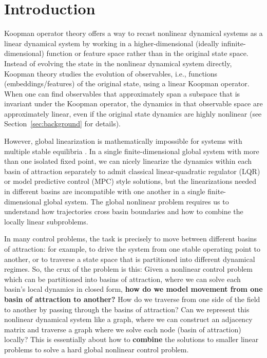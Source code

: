 \section{Introduction}

Koopman operator theory \citep{koopman_hamiltonian_1931, koopman_dynamical_1932, lan_linearization_2013,brunton_koopman_2016, brunton_modern_2022} offers a way to recast nonlinear dynamical systems as a linear dynamical system by working in a higher-dimensional (ideally infinite-dimensional) function or feature space rather than in the original state space.
Instead of evolving the state in the nonlinear dynamical system directly, Koopman theory studies the evolution of observables, i.e., functions (embeddings/features) of the original state, using a linear Koopman operator.
When one can find observables that approximately span a subspace that is invariant under the Koopman operator, the dynamics in that observable space are approximately linear, even if the original state dynamics are highly nonlinear (see Section~\ref{sec:background} for details).

However, global linearization is mathematically impossible for systems with multiple stable equilibria \citep{lan_linearization_2013, brunton_koopman_2016}.
In a single finite-dimensional global system with more than one isolated fixed point, we can nicely linearize the dynamics within each basin of attraction separately to admit classical linear-quadratic regulator (LQR) \citep{kalman_general_1960} or model predictive control (MPC) \citep{korda_linear_2018} style solutions, but the linearizations needed in different basins are incompatible with one another in a single finite-dimensional global system. The global nonlinear problem requires us to understand how trajectories cross basin boundaries and how to combine the locally linear subproblems.

In many control problems, the task is precisely to move between different basins of attraction: for example, to drive the system from one stable operating point to another, or to traverse a state space that is partitioned into different dynamical regimes. 
So, the crux of the problem is this: Given a nonlinear control problem which can be partitioned into basins of attraction, where we can solve each basin's local dynamics in closed form, \textbf{how do we model movement from one basin of attraction to another?}
How do we traverse from one side of the field to another by passing through the basins of attraction?
Can we represent this nonlinear dynamical system like a graph, where we can construct an adjacency matrix and traverse a graph where we solve each node (basin of attraction) locally?
This is essentially about how to \textbf{combine} the solutions to smaller linear problems to solve a hard global nonlinear control problem.

